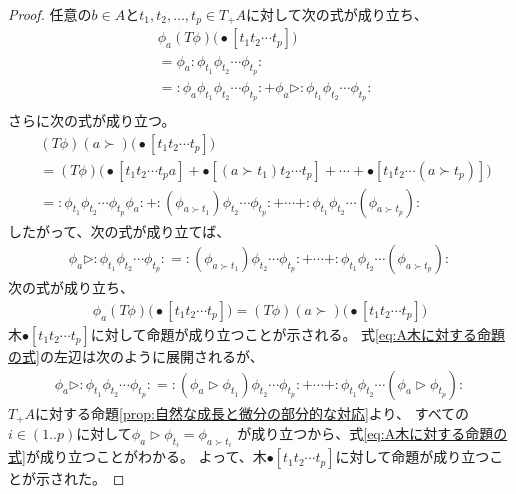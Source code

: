 \begin{proof}
任意の$b\in A$と$t_1,t_2,\dots,t_p\in T_+A$に対して次の式が成り立ち、
\begin{equation*}\begin{split} %
	&\phi_a(T\phi)\bigl(\bullet[t_1t_2\cdots t_p]\bigr) \\
	&= \phi_a:\phi_{t_1}\phi_{t_2}\cdots\phi_{t_p}: \\
	&= :\phi_a\phi_{t_1}\phi_{t_2}\cdots\phi_{t_p}:
		+ \phi_a\rhd:\phi_{t_1}\phi_{t_2}\cdots\phi_{t_p}: \\
\end{split}\end{equation*} %
さらに次の式が成り立つ。
\begin{equation*}\begin{split} %
	&(T\phi)(a\succ)\bigl(\bullet[t_1t_2\cdots t_p]\bigr) \\
	&= (T\phi)\bigl(\bullet[t_1t_2\cdots t_pa]
		+ \bullet[(a\succ t_1)t_2\cdots t_p]
		+ \cdots + \bullet[t_1t_2\cdots (a\succ t_p)]\bigr) \\
	&= :\phi_{t_1}\phi_{t_2}\cdots\phi_{t_p}\phi_a:
		+ :(\phi_{a\succ t_1})\phi_{t_2}\cdots\phi_{t_p}:
		+ \cdots + :\phi_{t_1}\phi_{t_2}\cdots(\phi_{a\succ t_p}):
\end{split}\end{equation*} %
したがって、次の式が成り立てば、
\begin{equation}\label{eq:A木に対する命題の式}\begin{split} %
	\phi_a\rhd:\phi_{t_1}\phi_{t_2}\cdots\phi_{t_p}:
	= :(\phi_{a\succ t_1})\phi_{t_2}\cdots\phi_{t_p}:
	+ \cdots + :\phi_{t_1}\phi_{t_2}\cdots(\phi_{a\succ t_p}):
\end{split}\end{equation} %
次の式が成り立ち、
\begin{equation*}\begin{split} %
	\phi_a(T\phi)\bigl(\bullet[t_1t_2\cdots t_p]\bigr)
	= (T\phi)(a\succ)\bigl(\bullet[t_1t_2\cdots t_p]\bigr)
\end{split}\end{equation*} %
木$\bullet[t_1t_2\cdots t_p]$に対して命題が成り立つことが示される。
式\eqref{eq:A木に対する命題の式}の左辺は次のように展開されるが、
\begin{equation*}\begin{split} %
	\phi_a\rhd:\phi_{t_1}\phi_{t_2}\cdots\phi_{t_p}:
	= :(\phi_a\rhd\phi_{t_1})\phi_{t_2}\cdots\phi_{t_p}:
	+ \cdots + :\phi_{t_1}\phi_{t_2}\cdots(\phi_a\rhd\phi_{t_p}):
\end{split}\end{equation*} %
$T_+A$に対する命題\ref{prop:自然な成長と微分の部分的な対応}より、
すべての$i\in(1..p)$に対して$\phi_a\rhd\phi_{t_i}=\phi_{a\succ t_i}$
が成り立つから、式\eqref{eq:A木に対する命題の式}が成り立つことがわかる。
よって、木$\bullet[t_1t_2\cdots t_p]$に対して命題が成り立つことが示された。
\end{proof} %

